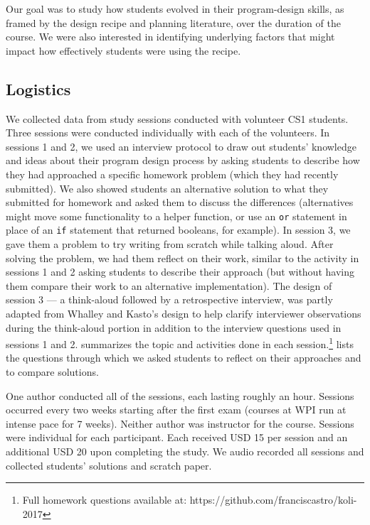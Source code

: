 Our goal was to study how students evolved in their program-design
skills, as framed by the \htdp design recipe and planning literature,
over the duration of the course.  We were also interested in
identifying underlying factors that might impact how effectively
students were using the recipe.

\subsection{Logistics}

We collected data from study sessions conducted with volunteer CS1 students. Three sessions were conducted individually with each of the volunteers. In sessions 1 and 2, we used an interview protocol to draw out students' knowledge and ideas about their program design process by asking students to describe how they had approached a specific homework problem (which they had recently submitted). We also showed students an alternative solution to what they submitted for homework and asked them to discuss the differences (alternatives might move some
functionality to a helper function, or use an \lstinline{or} statement
in place of an \lstinline{if} statement that returned booleans, for example). In session 3, we gave them a problem to try writing from scratch while talking aloud. After solving the problem, we had them reflect on their work, similar to the activity in sessions 1 and 2 asking students to describe their approach (but without having them compare their work to an alternative implementation). The design of session 3 --- a think-aloud followed by a retrospective interview, was partly adapted from Whalley and Kasto's design \cite{whalley_qualitative_2014} to help clarify interviewer observations during the think-aloud portion in addition to the interview questions used in sessions 1 and 2.
 summarizes the topic and activities done in each
session.\footnote{Full homework questions available at:
  https://github.com/franciscastro/koli-2017} 
lists the questions through which we asked students to reflect on
their approaches and to compare solutions.

One author conducted all of the sessions, each lasting roughly an
hour. Sessions occurred every two weeks starting after the first exam
(courses at WPI run at intense pace for 7 weeks). Neither
author was instructor for the course. Sessions were individual for
each participant. Each received USD 15 per session and an additional USD 20 upon completing the study. We audio recorded all sessions and collected students' solutions and scratch paper.

